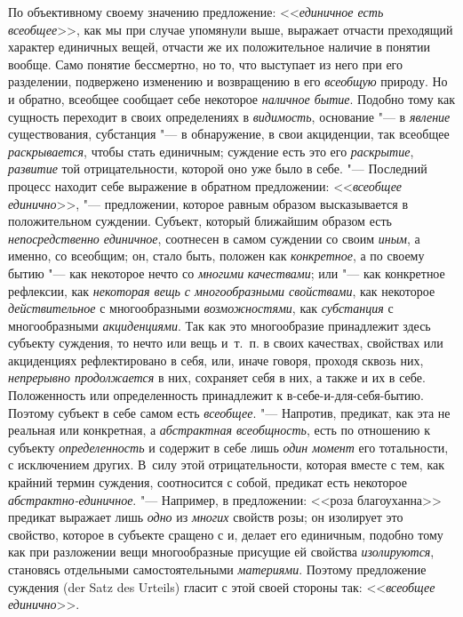 По объективному своему значению предложение:
<<{\em единичное есть всеобщее}>>,
как мы при случае упомянули выше, выражает отчасти преходящий
характер единичных вещей, отчасти же их положительное наличие в понятии
вообще. Само понятие бессмертно, но то, что выступает из него при его
разделении, подвержено изменению и возвращению в его
{\em всеобщую} природу.
Но и обратно, всеобщее сообщает себе некоторое
{\em наличное бытие}.
Подобно тому как сущность переходит в своих определениях в
{\em видимость},
основание "--- в
{\em явление}
существования, субстанция "--- в обнаружение, в
свои акциденции, так всеобщее
{\em раскрывается}, чтобы
стать единичным; суждение есть это его
{\em раскрытие},
{\em развитие} той
отрицательности, которой оно уже было в себе. "--- Последний
процесс находит себе выражение в обратном предложении:
<<{\em всеобщее единично}>>, "---
предложении, которое равным образом высказывается в
положительном суждении. Субъект, который ближайшим образом есть
{\em непосредственно единичное},
соотнесен в самом суждении со своим
{\em иным}, а именно,
со всеобщим; он, стало быть, положен как
{\em конкретное}, а по
своему бытию "--- как некоторое нечто со
{\em многими
}{\em качествами}; или
"--- как конкретное рефлексии, как
{\em некоторая вещь с многообразными
свойствами}, как некоторое
{\em действительное} с
многообразными {\em возможностями},
как {\em субстанция}
с многообразными
{\em акциденциями}. Так
как это многообразие принадлежит здесь субъекту суждения, то нечто или вещь
и~т.~п. в своих качествах, свойствах или акциденциях рефлектировано в себя,
или, иначе говоря, проходя сквозь них,
{\em непрерывно продолжается}
в них, сохраняет себя в них, а также и их в себе.
Положенность или определенность принадлежит к в-себе-и-для-себя-бытию.
Поэтому субъект в себе самом есть
{\em всеобщее}. "---
Напротив, предикат, как эта не реальная или конкретная, а
{\em абстрактная всеобщность},
есть по отношению к субъекту
{\em определенность} и
содержит в себе лишь {\em один момент}
его тотальности, с исключением других. В~силу этой
отрицательности, которая вместе с тем, как крайний термин суждения,
соотносится с собой, предикат есть некоторое
{\em абстрактно-единичное}. "---
Например, в предложении: <<роза благоуханна>> предикат выражает
лишь {\em одно} из {\em многих} свойств
розы; он изолирует это свойство, которое в субъекте сращено с и,
делает его единичным, подобно тому как при разложении вещи многообразные
присущие ей свойства {\em изолируются},
становясь отдельными самостоятельными
{\em материями}.
Поэтому предложение суждения (der Satz des Urteils)
гласит с этой своей стороны так: <<{\em всеобщее единично}>>.


